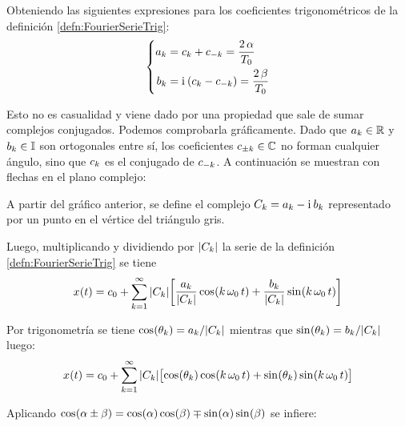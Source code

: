 \documentclass[a5paper,12pt,twoside]{book}
\begin{document}
Obteniendo las siguientes expresiones para los coeficientes trigonométricos de la definición \ref{defn:FourierSerieTrig}:
\begin{equation*}
    \left\{
    \begin{aligned}
        a_\kth &= c_\kth + c_{-\kth} = \frac{2 \, \alpha}{T_0}
        \\
        b_\kth &= \iu \bb{c_\kth - c_{-\kth}} = \frac{2 \, \beta}{T_0}
    \end{aligned}
    \right.
\end{equation*}

Esto no es casualidad y viene dado por una propiedad que sale de sumar complejos conjugados. Podemos comprobarla gráficamente. Dado que $a_\kth \in \setR$ y $b_\kth \in \setI$ son ortogonales entre sí, los coeficientes $c_{\pm\kth} \in \setC$ no forman cualquier ángulo, sino que $c_\kth$ es el conjugado de $c_{-\kth}$. A continuación se muestran con flechas en el plano complejo:


A partir del gráfico anterior, se define el complejo $C_\kth = a_\kth - \iu \, b_\kth$ representado por un punto en el vértice del triángulo gris.

Luego, multiplicando y dividiendo por $\norm{C_\kth}$ la serie de la definición \ref{defn:FourierSerieTrig} se tiene
\begin{equation*}
    \fx[x]{t} = c_0 + \sum_{\kth=1}^{\infty} \norm{C_\kth} \sqb{ \dfrac{a_\kth}{\norm{C_\kth}} \fx[\cos]{\kth \, \omega_0 \, t} + \dfrac{b_\kth}{\norm{C_\kth}} \fx[\sin]{\kth \, \omega_0 \, t} }
\end{equation*}

Por trigonometría se tiene $\fx[\cos]{\theta_\kth} = a_\kth / \norm{C_\kth}$ mientras que $\fx[\sin]{\theta_\kth} = b_\kth / \norm{C_\kth}$ luego:
\begin{equation*}
    \fx[x]{t} = c_0 + \sum_{\kth=1}^{\infty} \norm{C_\kth} \sqb{ \fx[\cos]{\theta_\kth} \fx[\cos]{\kth \, \omega_0 \, t} + \fx[\sin]{\theta_\kth} \fx[\sin]{\kth \, \omega_0 \, t} }
\end{equation*}

Aplicando $\fx[\cos]{\alpha \pm \beta} = \fx[\cos]{\alpha} \fx[\cos]{\beta} \mp \fx[\sin]{\alpha} \fx[\sin]{\beta}$ se infiere:
\end{document}
